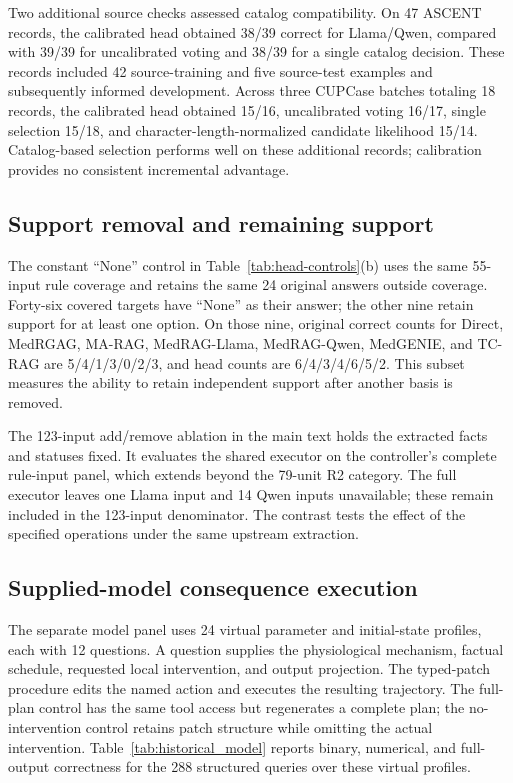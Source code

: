Two additional source checks assessed catalog compatibility. On 47 ASCENT records, the calibrated head obtained 38/39 correct for Llama/Qwen, compared with 39/39 for uncalibrated voting and 38/39 for a single catalog decision. These records included 42 source-training and five source-test examples and subsequently informed development. Across three CUPCase batches totaling 18 records, the calibrated head obtained 15/16, uncalibrated voting 16/17, single selection 15/18, and character-length-normalized candidate likelihood 15/14. Catalog-based selection performs well on these additional records; calibration provides no consistent incremental advantage.

\subsection{Support removal and remaining support}
The constant ``None'' control in Table~\ref{tab:head-controls}(b) uses the same 55-input rule coverage and retains the same 24 original answers outside coverage. Forty-six covered targets have ``None'' as their answer; the other nine retain support for at least one option. On those nine, original correct counts for Direct, MedRGAG, MA-RAG, MedRAG-Llama, MedRAG-Qwen, MedGENIE, and TC-RAG are 5/4/1/3/0/2/3, and head counts are 6/4/3/4/6/5/2. This subset measures the ability to retain independent support after another basis is removed.

The 123-input add/remove ablation in the main text holds the extracted facts and statuses fixed. It evaluates the shared executor on the controller's complete rule-input panel, which extends beyond the 79-unit R2 category. The full executor leaves one Llama input and 14 Qwen inputs unavailable; these remain included in the 123-input denominator. The contrast tests the effect of the specified operations under the same upstream extraction.

\subsection{Supplied-model consequence execution}
\label{app:model}
The separate model panel uses 24 virtual parameter and initial-state profiles, each with 12 questions. A question supplies the physiological mechanism, factual schedule, requested local intervention, and output projection. The typed-patch procedure edits the named action and executes the resulting trajectory. The full-plan control has the same tool access but regenerates a complete plan; the no-intervention control retains patch structure while omitting the actual intervention. Table~\ref{tab:historical_model} reports binary, numerical, and full-output correctness for the 288 structured queries over these virtual profiles.

